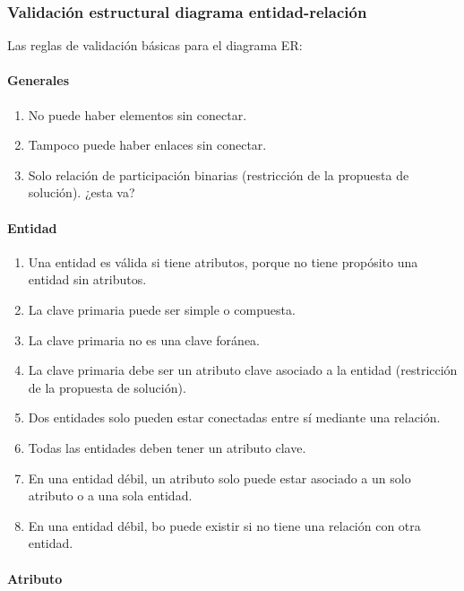 \subsubsection{Validación estructural diagrama entidad-relación}

Las reglas de validación básicas para el diagrama ER:

\paragraph*{Generales}
\begin{enumerate}
    \item No puede haber elementos sin conectar.
    \item Tampoco puede haber enlaces sin conectar.
    \item Solo relación de participación binarias (restricción de la propuesta de solución). ¿esta va?
\end{enumerate}


\paragraph*{Entidad}
\begin{enumerate}
    \item Una entidad es válida si tiene atributos, porque no tiene propósito una entidad sin atributos.
    \item La clave primaria puede ser simple o compuesta.
    \item La clave primaria no es una clave foránea.
    \item La clave primaria debe ser un atributo clave asociado a la entidad (restricción de la propuesta de solución).
    \item Dos entidades solo pueden estar conectadas entre sí mediante una relación.
    \item Todas las entidades deben tener un atributo clave.
    \item En una entidad débil, un atributo solo puede estar asociado a un solo atributo o a una sola entidad.
    \item En una entidad débil, bo puede existir si no tiene una relación con otra entidad.
\end{enumerate}

\paragraph*{Atributo}


